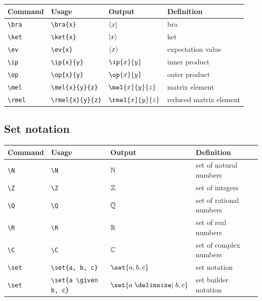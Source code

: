 \documentclass[11pt]{article}
\begin{document}
\begin{tabular}{llll}
    Command      & Usage                 & Output           & Definition                \\
    \hline
    \verb|\bra|  & \verb|\bra{x}|        & $\langle x\rvert$        & bra                       \\
    \verb|\ket|  & \verb|\ket{x}|        & $\lvert x\rangle$        & ket                       \\
    \verb|\ev|   & \verb|\ev{x}|         & $\langle x\rangle$         & expectation value         \\
    \verb|\ip|   & \verb|\ip{x}{y}|      & $\ip{x}{y}$      & inner product             \\
    \verb|\op|   & \verb|\op{x}{y}|      & $\op{x}{y}$      & outer product             \\
    \verb|\mel|  & \verb|\mel{x}{y}{z}|  & $\mel{x}{y}{z}$  & matrix element            \\
    \verb|\rmel| & \verb|\rmel{x}{y}{z}| & $\rmel{x}{y}{z}$ & reduced matrix element    \\
\end{tabular}

\subsection{Set notation}

\begin{tabular}{llll}
    Command     & Usage                      & Output                & Definition              \\
    \hline
    \verb|\N|   & \verb|\N|                  & $\mathbb{N}$                  & set of natural numbers  \\
    \verb|\Z|   & \verb|\Z|                  & $\mathbb{Z}$                  & set of integers         \\
    \verb|\Q|   & \verb|\Q|                  & $\mathbb{Q}$                  & set of rational numbers \\
    \verb|\R|   & \verb|\R|                  & $\mathbb{R}$                  & set of real numbers     \\
    \verb|\C|   & \verb|\C|                  & $\mathbb{C}$                  & set of complex numbers  \\
    \verb|\set| & \verb|\set{a, b, c}|       & $\set{a, b, c}$       & set notation            \\
    \verb|\set| & \verb|\set{a \given b, c}| & $\set{a \given b, c}$ & set builder notation    \\
\end{tabular}
\end{document}
